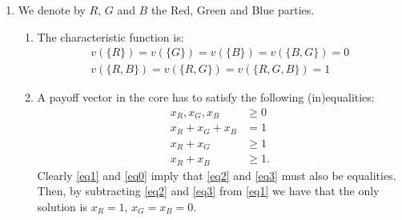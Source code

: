 \documentclass[11pt]{article} \usepackage{amssymb}
\newtheorem*{theorem*}{Theorem}
\begin{document}
\begin{enumerate}
\begin{enumerate}
    {\bf Proof of the first direction of the Shapley-Bondareva theorem.}
    \begin{theorem*}[Shapley - Bondareva]
      If $C(v) \neq \emptyset$ then for every balanced collection
      $\{S_1,\ldots,S_k\}$ with balancing weights $\{\lambda_i\}$ it
      holds that $\sum_{i=1}^k\lambda_iv(S_i) \leq v(N)$.
    \end{theorem*}
    \begin{proof}
      Let $x$ be in the core of $v$, and let $\{S_1,\ldots,S_k\}$ be a
      balanced collection with balancing weights $\{\lambda_i\}$. Then
      $\sum_{j \in S_i}x_j \geq v(S_i)$ and so $\lambda_i\sum_{j \in
        S_i}x_j \geq \lambda_iv(S_i)$. We now sum over $i$:
      \begin{align*}
        \sum_{i=1}^k\lambda_iv(S_i) &\leq \sum_{i=1}^k\lambda_i\sum_{j
          \in S_i}x_j
        \\ &= \sum_{i=1}^k\sum_{j \in S_i}\lambda_ix_j
        \\ &= \sum_{i=1}^k\sum_{j}{\bf 1}_{j\in S_i}\lambda_ix_j
        \\ &= \sum_{j}x_j\sum_{i=1}^k{\bf 1}_{j\in S_i}\lambda_i
        \\ &= \sum_{j}x_j\sum_{i: j \in S_i}^k\lambda_i
        \\ &= \sum_{j}x_j
        \\ &\leq v(N)
      \end{align*}
    \end{proof}
  \item We denote by $R$, $G$ and $B$ the Red, Green and Blue
      parties. 
    \begin{enumerate}
    \item 
      The characteristic function is:
      \begin{align*}
        v(\{R\}) = v(\{G\}) = v(\{B\}) = v(\{B, G\}) = 0
        \\ v(\{R, B\}) = v(\{R, G\}) = v(\{R, G, B\}) = 1
      \end{align*}

    \item
      A payoff vector in the core has to satisfy the following
      (in)equalities:
      \begin{align}
        x_R,x_G,x_B &\geq 0 \label{eq0}
        \\ x_R+x_G+x_B &= 1 \label{eq1}
        \\ x_R+x_G &\geq 1 \label{eq2}
        \\ x_R+x_B &\geq 1. \label{eq3}
      \end{align}
      Clearly \eqref{eq1} and \eqref{eq0} imply that \eqref{eq2} and
      \eqref{eq3} must also be equalities. Then, by subtracting
      \eqref{eq2} and \eqref{eq3} from \eqref{eq1} we have that the
      only solution is $x_R=1$, $x_G=x_B=0$.


\end{enumerate}
\end{enumerate}
\end{enumerate}
\end{document}
